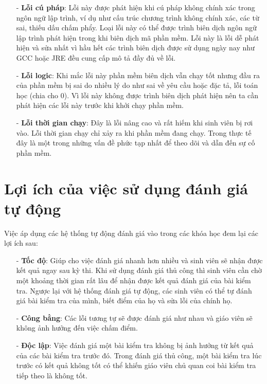 \documentclass[12pt,a4paper]{report}
\begin{document}
\begin{itemize}
\item[-] \textbf{Lỗi cú pháp}: Lỗi này được phát hiện khi cú pháp không chính xác trong ngôn ngữ lập trình, ví dụ như cấu trúc chương trình không chính xác, các từ sai, thiếu dấu chấm phẩy. Loại lỗi này có thể được trình biên dịch ngôn ngữ lập trình phát hiện trong khi biên dịch mã phần mềm. Lỗi này là lỗi dễ phát hiện và sửa nhất vì hầu hết các trình biên dịch được sử dụng ngày nay như GCC hoặc JRE đều cung cấp mô tả đầy đủ về lỗi.
\item[-] \textbf{Lỗi logic}: Khi mắc lỗi này phần mềm biên dịch vẫn chạy tốt nhưng đầu ra của phần mềm bị sai do nhiều lý do như sai về yêu cầu hoặc đặc tả, lỗi toán học (chia cho 0). Vì lỗi này không được trình biên dịch phát hiện nên ta cần phát hiện các lỗi này trước khi khởi chạy phần mềm.
\item[-] \textbf{Lỗi thời gian chạy}: Đây là lỗi nâng cao và rất hiếm khi sinh viên bị rơi vào. Lỗi thời gian chạy chỉ xảy ra khi phần mềm đang chạy. Trong thực tế đây là một trong những vấn đề phức tạp nhất để theo dõi và dẫn đến sự cố phần mềm.
\end{itemize}
\section{Lợi ích của việc sử dụng đánh giá tự động}
Việc áp dụng các hệ thống tự động đánh giá vào trong các khóa học đem lại các lợi ích sau:

\begin{itemize}
\item[-] \textbf{Tốc độ}: Giúp cho việc đánh giá nhanh hơn nhiều và sinh viên sẽ nhận được kết quả ngay sau kỳ thi. Khi sử dụng đánh giá thủ công thì sinh viên cần chờ một khoảng thời gian rất lâu để nhận được kết quả đánh giá của bài kiểm tra. Ngược lại với hệ thống đánh giá tự động, các sinh viên có thể tự đánh giá bài kiểm tra của mình, biết điểm của họ và sửa lỗi của chính họ.
\item[-] \textbf{Công bằng}: Các lỗi tương tự sẽ được đánh giá như nhau và giáo viên sẽ không ảnh hưởng đến việc chấm điểm.
\item[-] \textbf{Độc lập}: Việc đánh giá một bài kiểm tra không bị ảnh hưởng từ kết quả của các bài kiểm tra trước đó. Trong đánh giá thủ công, một bài kiểm tra lúc trước có kết quả không tốt có thể khiến giáo viên chủ quan coi bài kiểm tra tiếp theo là không tốt.
\end{itemize} \newpage
\end{document}
